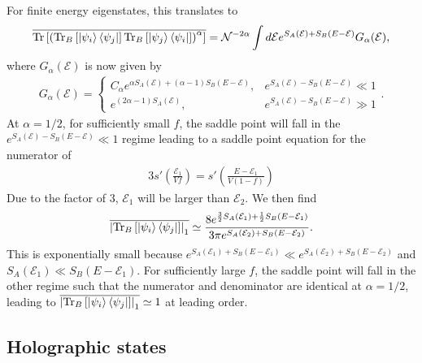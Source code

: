 \documentclass[a4paper,11pt]{article}
\newcommand{\Tr}{\text{Tr}}
\begin{document}
For finite energy eigenstates, this translates to 
\begin{align}
    \overline{\Tr\left[ \left(\Tr_B\left[\ket{\psi_i}\bra{\psi_j} \right]\Tr_B\left[\ket{\psi_j}\bra{\psi_i} \right]\right)^{\alpha}\right]} = \mathcal{N}^{-2\alpha} \int d\mathcal{E}e^{S_A(\mathcal{E}) +S_B(E-\mathcal{E})}G_{\alpha}(\mathcal{E}),
\end{align}
where $G_{\alpha}(\mathcal{E})$ is now given by
\begin{align}
    G_{\alpha}(\mathcal{E}) = \begin{cases}
       C_{\alpha}e^{\alpha S_A(\mathcal{E}) +(\alpha-1)S_B(E-\mathcal{E})}, & e^{S_A(\mathcal{E})-S_B(E-\mathcal{E})} \ll 1
       \\
       e^{ (2\alpha-1)S_A(\mathcal{E})}, &  e^{S_A(\mathcal{E})-S_B(E-\mathcal{E})} \gg 1
    \end{cases}.
\end{align}
At $\alpha = 1/2$, for sufficiently small $f$, the saddle point will fall in the $e^{S_A(\mathcal{E})-S_B(E-\mathcal{E})} \ll 1$ regime leading to a saddle point equation for the numerator of 
\begin{align}
    3s'\left( \frac{\mathcal{E}_1}{Vf}\right) = s'\left( \frac{E-\mathcal{E}_1}{V(1-f)}\right)
\end{align}
Due to the factor of $3$, $\mathcal{E}_1$ will be larger than $\mathcal{E}_2$. We then find
\begin{align}
    \overline{\left|\Tr_B\left[\ket{\psi_i}\bra{\psi_j} \right] \right|_1} \simeq \frac{8 e^{\frac{3}{2}S_A(\mathcal{E}_1) +\frac{1}{2}S_B(E-\mathcal{E}_1)}}{3\pi e^{S_A(\mathcal{E}_2) +S_B(E-\mathcal{E}_2)}}.
\end{align}
This is exponentially small because $ e^{S_A(\mathcal{E}_1) +S_B(E-\mathcal{E}_1)}\ll e^{S_A(\mathcal{E}_2) +S_B(E-\mathcal{E}_2)}$ and $S_A(\mathcal{E}_1) \ll S_B(E-\mathcal{E}_1)$. For sufficiently large $f$, the saddle point will fall in the other regime such that the numerator and denominator are identical at $\alpha = 1/2$, leading to $\overline{\left|\Tr_B\left[\ket{\psi_i}\bra{\psi_j} \right] \right|_1} \simeq 1$ at leading order.

\subsection{Holographic states}
\end{document}
